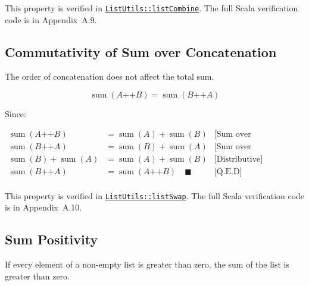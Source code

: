 {\raggedright
This property is verified in
\href{https://github.com/thiagomata/prime-numbers/blob/list-article-v1.0.0/src/main/scala/v1/chapter3/list/ListUtils.scala}{\texttt{ListUtils::\allowbreak listCombine}}.
The full Scala verification code is in Appendix~A.9.
\par}

\subsection{Commutativity of Sum over Concatenation}

The order of concatenation does not affect the total sum.

\begin{equation*}
\operatorname{sum}(A \mathbin{\texttt{++}} B) = \operatorname{sum}(B \mathbin{\texttt{++}} A)
\end{equation*}

Since:\par\nopagebreak

\begin{equation*}
\begin{aligned}
\operatorname{sum}(A \mathbin{\texttt{++}} B) & = \operatorname{sum}(A) + \operatorname{sum}(B) & \text{[Sum over Concatenation]} \\
\operatorname{sum}(B \mathbin{\texttt{++}} A) & = \operatorname{sum}(B) + \operatorname{sum}(A) & \text{[Sum over Concatenation]} \\
\operatorname{sum}(B) + \operatorname{sum}(A) & = \operatorname{sum}(A) + \operatorname{sum}(B) & \text{[Distributive]} \\
\operatorname{sum}(B \mathbin{\texttt{++}} A) & = \operatorname{sum}(A \mathbin{\texttt{++}} B) \quad \blacksquare & \text{[Q.E.D]} \\
\end{aligned}
\end{equation*}

{\raggedright
This property is verified in
\href{https://github.com/thiagomata/prime-numbers/blob/list-article-v1.0.0/src/main/scala/v1/chapter3/list/ListUtils.scala}{\texttt{ListUtils::\allowbreak listSwap}}.
The full Scala verification code is in Appendix~A.10.
\par}

\subsection{Sum Positivity}

If every element of a non-empty list is greater than zero, the sum of the
list is greater than zero.

